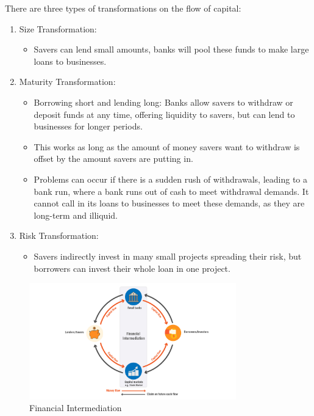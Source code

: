 There are three types of transformations on the flow of capital:
\begin{enumerate}
    \item Size Transformation:
    \begin{itemize}
        \item Savers can lend small amounts, banks will pool these funds to make large loans to businesses.
    \end{itemize}
    \item Maturity Transformation:
    \begin{itemize}
        \item Borrowing short and lending long: Banks allow savers to withdraw or deposit funds at any time, offering liquidity to savers, but can lend to businesses for longer periods.
        \item This works as long as the amount of money savers want to withdraw is offset by the amount savers are putting in. 
        \item Problems can occur if there is a sudden rush of withdrawals, leading to a bank run, where a bank runs out of cash to meet withdrawal demands. It cannot call in its loans to businesses to meet these demands, as they are long-term and illiquid.
    \end{itemize}
    \item Risk Transformation:
    \begin{itemize}
        \item Savers indirectly invest in many small projects spreading their risk, but borrowers can invest their whole loan in one project.
    \end{itemize}
\end{enumerate}

\begin{figure}[H]
    \centering
    \includegraphics[width=0.8\textwidth]{img/1.1.jpeg}
    \caption{Financial Intermediation}
    \label{fig:financial_intermediation}
\end{figure}

